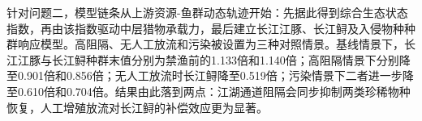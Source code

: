 针对问题二，模型链条从上游资源-鱼群动态轨迹开始：先据此得到综合生态状态指数，再由该指数驱动中层猎物承载力，最后建立长江江豚、长江鲟及入侵物种种群响应模型。高阻隔、无人工放流和污染被设置为三种对照情景。基线情景下，长江江豚与长江鲟种群末值分别为禁渔前的1.133倍和1.140倍；高阻隔情景下分别降至0.901倍和0.856倍；无人工放流时长江鲟降至0.519倍；污染情景下二者进一步降至0.610倍和0.704倍。结果由此落到两点：江湖通道阻隔会同步抑制两类珍稀物种恢复，人工增殖放流对长江鲟的补偿效应更为显著。